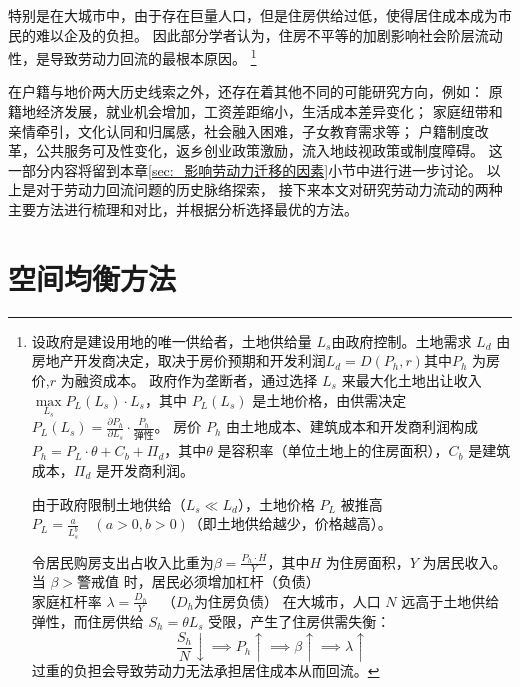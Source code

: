 \documentclass[a4paper,12pt,oneside, fontset=mac]{ctexbook} %
\begin{document}
特别是在大城市中，由于存在巨量人口，但是住房供给过低，使得居住成本成为市民的难以企及的负担。
因此部分学者认为，住房不平等的加剧影响社会阶层流动性，是导致劳动力回流的最根本原因。
\footnote{
  设政府是建设用地的唯一供给者，土地供给量 \( L_s \)由政府控制。土地需求 \( L_d \) 由房地产开发商决定，取决于房价预期和开发利润\(L_d = D(P_h, r)\)其中\( P_h \) 为房价,\( r \) 为融资成本。
  政府作为垄断者，通过选择 \( L_s \) 来最大化土地出让收入\(\max\limits_{L_s}  P_L(L_s) \cdot L_s \)，其中 \( P_L(L_s) \) 是土地价格，由供需决定\( P_L(L_s) = \frac{\partial P_h}{\partial L_s} \cdot \frac{P_h}{\text{弹性}} \)。
  房价 \( P_h \) 由土地成本、建筑成本和开发商利润构成$P_h = P_L \cdot \theta + C_b + \Pi_d$，其中\( \theta \) 是容积率（单位土地上的住房面积），\( C_b \) 是建筑成本，\( \Pi_d \) 是开发商利润。

  由于政府限制土地供给（\( L_s \ll L_d \)），土地价格 \( P_L \) 被推高$P_L = \frac{a}{L_s^b} \quad (a>0, b>0)$（即土地供给越少，价格越高）。

  令居民购房支出占收入比重为$\beta = \frac{P_h \cdot H}{Y}$，其中\( H \) 为住房面积，\( Y \) 为居民收入。
  当 \( \beta > \text{警戒值}\) 时，居民必须增加杠杆（负债）
  $\text{家庭杠杆率 } \lambda = \frac{D_h}{Y} \quad \text{（} D_h \text{为住房负债）}$
  在大城市，人口 \( N \) 远高于土地供给弹性，而住房供给 \( S_h = \theta L_s \) 受限，产生了住房供需失衡：
  \[
  \frac{S_h}{N} \downarrow \implies P_h \uparrow \implies \beta \uparrow \implies \lambda \uparrow
  \]
  过重的负担会导致劳动力无法承担居住成本从而回流。
}

在户籍与地价两大历史线索之外，还存在着其他不同的可能研究方向，例如：
原籍地经济发展，就业机会增加，工资差距缩小，生活成本差异变化；
家庭纽带和亲情牵引，文化认同和归属感，社会融入困难，子女教育需求等；
户籍制度改革，公共服务可及性变化，返乡创业政策激励，流入地歧视政策或制度障碍。
这一部分内容将留到本章\ref{sec:_影响劳动力迁移的因素}小节中进行进一步讨论。
以上是对于劳动力回流问题的历史脉络探索，
接下来本文对研究劳动力流动的两种主要方法进行梳理和对比，并根据分析选择最优的方法。

\section{空间均衡方法}
\end{document}
